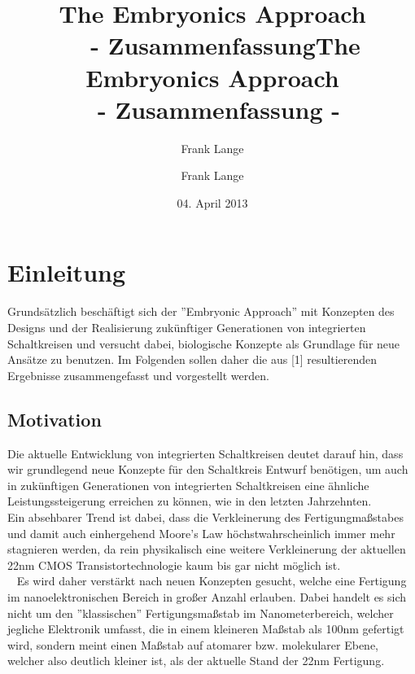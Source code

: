 \documentclass[12p, a4]{article}
\title{The Embryonics Approach\\ \ \newline \ \newline - Zusammenfassung}
\author{Frank Lange}
\begin{document}
\begin{titlepage}
\title{The Embryonics Approach\\ \ \newline- Zusammenfassung -}
\author{Frank Lange}
\date{04. April 2013}
\maketitle
\thispagestyle{empty}
\end{titlepage}


\tableofcontents
\newpage





\section{Einleitung}
Grundsätzlich beschäftigt sich der ''Embryonic Approach'' mit Konzepten des
Designs und der Realisierung zukünftiger Generationen von integrierten
Schaltkreisen und versucht dabei, biologische Konzepte als Grundlage für
neue Ansätze zu benutzen. Im Folgenden sollen daher die aus [1] resultierenden
Ergebnisse zusammengefasst und vorgestellt werden.\\


\subsection{Motivation}
Die aktuelle Entwicklung von integrierten Schaltkreisen deutet darauf hin,
dass wir grundlegend neue Konzepte für den Schaltkreis Entwurf benötigen,
um auch in zukünftigen Generationen von integrierten Schaltkreisen eine
ähnliche Leistungssteigerung erreichen zu können, wie in den letzten
Jahrzehnten.\\
Ein absehbarer Trend ist dabei, dass die Verkleinerung des
Fertigungmaßstabes und damit auch einhergehend Moore's Law
höchstwahrscheinlich immer mehr stagnieren werden, da rein physikalisch
eine weitere Verkleinerung der aktuellen 22nm CMOS Transistortechnologie
kaum bis gar nicht möglich ist.\\
\ \newline
Es wird daher verstärkt nach neuen Konzepten gesucht, welche eine Fertigung
im nanoelektronischen Bereich in großer Anzahl erlauben. Dabei handelt es
sich nicht um den ''klassischen'' Fertigungsmaßstab im Nanometerbereich,
welcher jegliche Elektronik umfasst, die in einem kleineren Maßstab als 100nm
gefertigt wird, sondern meint einen Maßstab auf atomarer bzw. molekularer
Ebene, welcher also deutlich kleiner ist, als der aktuelle Stand der 22nm
Fertigung.\\
\end{document}
